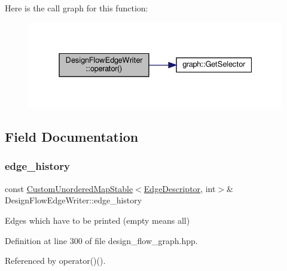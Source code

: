 Here is the call graph for this function\+:
\nopagebreak
\begin{figure}[H]
\begin{center}
\leavevmode
\includegraphics[width=331pt]{d4/dd8/classDesignFlowEdgeWriter_ae15c12d95676a26eb77a96356000007e_cgraph}
\end{center}
\end{figure}


\subsection{Field Documentation}
\mbox{\label{classDesignFlowEdgeWriter_a2b7e72d6aa6ed86b52d6b5d47cb6828a}} 
\subsubsection{\texorpdfstring{edge\+\_\+history}{edge\_history}}
{\footnotesize\ttfamily const \hyperlink{custom__map_8hpp_a7314a7df1cdb3a3acf478ab86e95c226}{Custom\+Unordered\+Map\+Stable}$<$\hyperlink{graph_8hpp_a9eb9afea34e09f484b21f2efd263dd48}{Edge\+Descriptor}, int$>$\& Design\+Flow\+Edge\+Writer\+::edge\+\_\+history\hspace{0.3cm}{\ttfamily [private]}}



Edges which have to be printed (empty means all) 



Definition at line 300 of file design\+\_\+flow\+\_\+graph.\+hpp.



Referenced by operator()().

\mbox{\label{classDesignFlowEdgeWriter_a3e839beeb21940663760c1b2c076f4d2}} 
